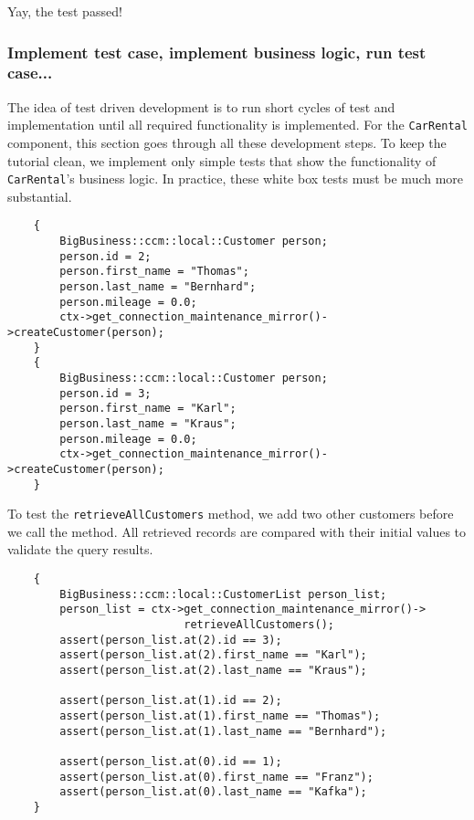 Yay, the test passed!



\subsubsection{Implement test case, implement business logic, run test case...}

The idea of test driven development is to run short cycles of test and
implementation until all required functionality is implemented.
For the {\tt CarRental} component, this section goes through all these 
development steps. 
To keep the tutorial clean, we implement only simple tests that show the
functionality of {\tt CarRental}'s business logic.
In practice, these white box tests must be much more substantial.

\begin{small}
\begin{verbatim}
    {
        BigBusiness::ccm::local::Customer person;
        person.id = 2;
        person.first_name = "Thomas";
        person.last_name = "Bernhard";
        person.mileage = 0.0;
        ctx->get_connection_maintenance_mirror()->createCustomer(person);
    }
    {
        BigBusiness::ccm::local::Customer person;
        person.id = 3;
        person.first_name = "Karl";
        person.last_name = "Kraus";
        person.mileage = 0.0;
        ctx->get_connection_maintenance_mirror()->createCustomer(person);
    }
\end{verbatim}
\end{small}

To test the {\tt retrieveAllCustomers} method, we add two other customers before
we call the method. All retrieved records are compared with their initial values
to validate the query results. 

\begin{small}
\begin{verbatim}
    {
        BigBusiness::ccm::local::CustomerList person_list;
        person_list = ctx->get_connection_maintenance_mirror()->
                           retrieveAllCustomers();
        assert(person_list.at(2).id == 3);
        assert(person_list.at(2).first_name == "Karl");
        assert(person_list.at(2).last_name == "Kraus");
        
        assert(person_list.at(1).id == 2);
        assert(person_list.at(1).first_name == "Thomas");
        assert(person_list.at(1).last_name == "Bernhard");
        
        assert(person_list.at(0).id == 1);
        assert(person_list.at(0).first_name == "Franz");
        assert(person_list.at(0).last_name == "Kafka");
    }     
\end{verbatim}
\end{small}

